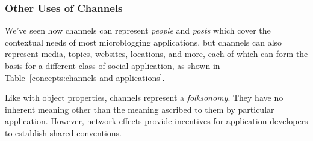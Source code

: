 





\subsubsection{Other Uses of Channels}

We've seen how channels can represent \emph{people} and \emph{posts}
which cover the contextual needs of most microblogging applications,
but channels can also represent
media, topics, websites, locations, and more,
each of which can form the basis for a different class of
social application, as shown in Table~\ref{concepts:channels-and-applications}.

Like with object properties, channels represent a \emph{folksonomy}.
They have no inherent meaning other than the meaning ascribed to them
by particular application. However, network effects provide incentives for
application developers to establish shared conventions.

